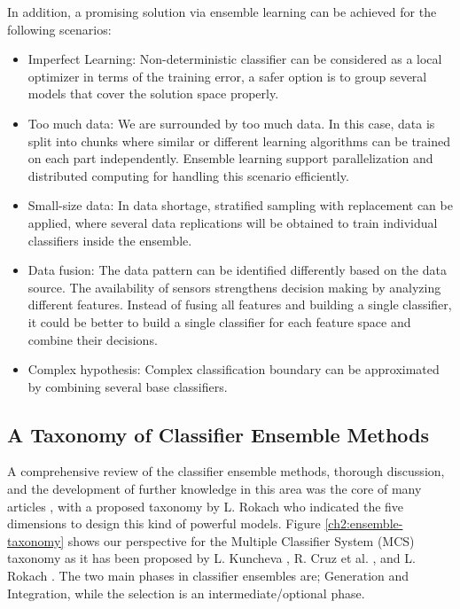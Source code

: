 In addition, a promising solution via ensemble learning can be achieved for the following scenarios:

\begin{itemize}[nosep]
    \item Imperfect Learning: Non-deterministic classifier can be considered as a local optimizer in terms of the training error, a safer option is to group several models that cover the solution space properly.
    \item Too much data: We are surrounded by too much data. In this case, data is split into chunks where similar or different learning algorithms can be trained on each part independently. Ensemble learning support parallelization and distributed computing for handling this scenario efficiently.
    \item Small-size data: In data shortage, stratified sampling with replacement can be applied, where several data replications will be obtained to train individual classifiers inside the ensemble. 
    \item Data fusion: The data pattern can be identified differently based on the data source. The availability of sensors strengthens decision making by analyzing different features. Instead of fusing all features and building a single classifier, it could be better to build a single classifier for each feature space and combine their decisions.  
    \item Complex hypothesis: Complex classification boundary can be approximated by combining several base classifiers.
    
\end{itemize}


\subsection{A Taxonomy of Classifier Ensemble Methods } \label{ch2.taxonomy}

A comprehensive review of the classifier ensemble methods, thorough discussion, and the development of further knowledge in this area was the core of many articles \cite{gonzalez2020,polikar2006,cruz2018, britto2014,re2012,sewell2008}, with a proposed taxonomy by L. Rokach \cite{rokach2009} who indicated the five dimensions to design this kind of powerful models. Figure \ref{ch2:ensemble-taxonomy} shows our perspective for the Multiple Classifier System (MCS) taxonomy as it has been proposed by L. Kuncheva \cite{kuncheva2014}, R. Cruz et al. \cite{cruz2018}, and L. Rokach \cite{rokach2009}. The two main phases in classifier ensembles are; Generation and Integration, while the selection is an intermediate/optional phase.   

